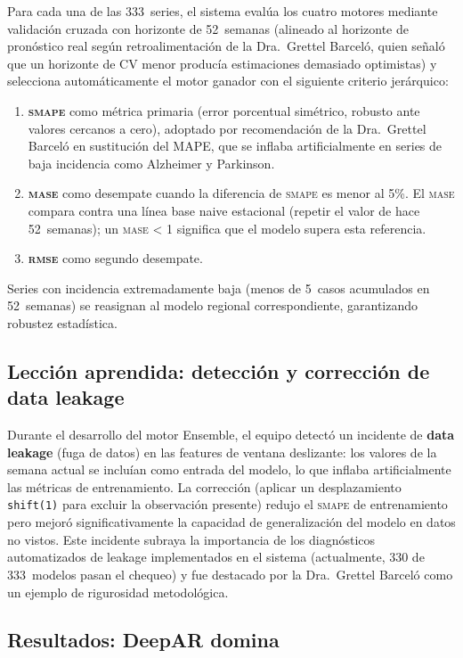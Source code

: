 \documentclass[12pt, letterpaper]{article}
\newcommand{\smape}{\textnormal{\textsc{smape}}}
\newcommand{\mase}{\textnormal{\textsc{mase}}}
\newcommand{\rmse}{\textnormal{\textsc{rmse}}}
\begin{document}
Para cada una de las 333~series, el sistema evalúa los cuatro motores mediante validación cruzada con horizonte de 52~semanas (alineado al horizonte de pronóstico real según retroalimentación de la Dra.~Grettel Barceló, quien señaló que un horizonte de CV menor producía estimaciones demasiado optimistas) y selecciona automáticamente el motor ganador con el siguiente criterio jerárquico:

\begin{enumerate}
  \item \textbf{\smape{}} como métrica primaria (error porcentual simétrico, robusto ante valores cercanos a cero), adoptado por recomendación de la Dra.~Grettel Barceló en sustitución del MAPE, que se inflaba artificialmente en series de baja incidencia como Alzheimer y Parkinson.
  \item \textbf{\mase{}} como desempate cuando la diferencia de \smape{} es menor al 5\%. El \mase{} compara contra una línea base naive estacional (repetir el valor de hace 52~semanas); un \mase{} < 1 significa que el modelo supera esta referencia.
  \item \textbf{\rmse{}} como segundo desempate.
\end{enumerate}

Series con incidencia extremadamente baja (menos de 5~casos acumulados en 52~semanas) se reasignan al modelo regional correspondiente, garantizando robustez estadística.

\subsection{Lección aprendida: detección y corrección de data leakage}

Durante el desarrollo del motor Ensemble, el equipo detectó un incidente de \textbf{data leakage} (fuga de datos) en las features de ventana deslizante: los valores de la semana actual se incluían como entrada del modelo, lo que inflaba artificialmente las métricas de entrenamiento. La corrección (aplicar un desplazamiento \texttt{shift(1)} para excluir la observación presente) redujo el \smape{} de entrenamiento pero mejoró significativamente la capacidad de generalización del modelo en datos no vistos. Este incidente subraya la importancia de los diagnósticos automatizados de leakage implementados en el sistema (actualmente, 330 de 333~modelos pasan el chequeo) y fue destacado por la Dra.~Grettel Barceló como un ejemplo de rigurosidad metodológica.

\subsection{Resultados: DeepAR domina}
\end{document}

